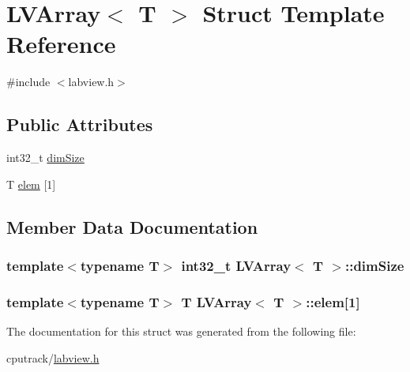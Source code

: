 \hypertarget{struct_l_v_array}{}\section{L\+V\+Array$<$ T $>$ Struct Template Reference}
\label{struct_l_v_array}


{\ttfamily \#include $<$labview.\+h$>$}

\subsection*{Public Attributes}
\begin{DoxyCompactItemize}
\item 
int32\+\_\+t \hyperlink{struct_l_v_array_ab8675a32536e5d3f7ffc612977f88c33}{dim\+Size}
\item 
T \hyperlink{struct_l_v_array_ae16a95ba6a951d662346b3cce826e40d}{elem} \mbox{[}1\mbox{]}
\end{DoxyCompactItemize}


\subsection{Member Data Documentation}
\subsubsection[{\texorpdfstring{dim\+Size}{dimSize}}]{\setlength{\rightskip}{0pt plus 5cm}template$<$typename T$>$ int32\+\_\+t {\bf L\+V\+Array}$<$ T $>$\+::dim\+Size}\hypertarget{struct_l_v_array_ab8675a32536e5d3f7ffc612977f88c33}{}\label{struct_l_v_array_ab8675a32536e5d3f7ffc612977f88c33}
\subsubsection[{\texorpdfstring{elem}{elem}}]{\setlength{\rightskip}{0pt plus 5cm}template$<$typename T$>$ T {\bf L\+V\+Array}$<$ T $>$\+::elem\mbox{[}1\mbox{]}}\hypertarget{struct_l_v_array_ae16a95ba6a951d662346b3cce826e40d}{}\label{struct_l_v_array_ae16a95ba6a951d662346b3cce826e40d}


The documentation for this struct was generated from the following file\+:\begin{DoxyCompactItemize}
\item 
cputrack/\hyperlink{labview_8h}{labview.\+h}\end{DoxyCompactItemize}
